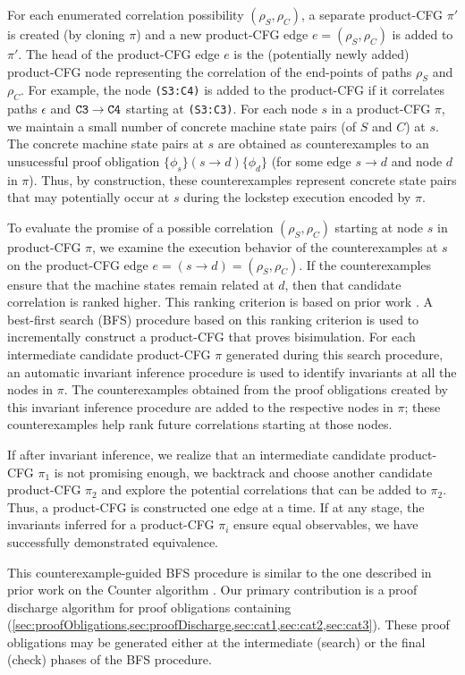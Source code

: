For each enumerated correlation possibility $(\rho_S,\rho_C)$,
a separate
product-CFG $\pi'$ is created (by cloning $\pi$)
and a new product-CFG
edge $e=(\rho_S,\rho_C)$ is added to $\pi'$.
The head of the product-CFG edge $e$ is the
(potentially newly added) product-CFG node representing
the correlation of the end-points of paths $\rho_S$
and $\rho_C$. For example, the node {\tt (S3:C4)} is added
to the product-CFG if it correlates paths $\epsilon$ and ${\tt C3\rightarrow{}C4}$
starting at {\tt (S3:C3)}.
For each node $s$ in a product-CFG $\pi$, we maintain
a small number of
concrete machine state pairs (of $S$ and $C$) at $s$.
The concrete
machine state pairs at $s$
are obtained as
counterexamples to an unsucessful proof
obligation $\{\phi_s\} (s \rightarrow d) \{\phi_d\}$ (for
some edge $s \rightarrow d$ and node $d$ in $\pi$).
Thus, by construction, these counterexamples represent
concrete state pairs that
may potentially occur
at $s$ during the lockstep execution encoded
by $\pi$.

To evaluate the promise of a possible correlation
$(\rho_S,\rho_C)$ starting at node $s$
in product-CFG $\pi$,
we examine the execution
behavior of the counterexamples at $s$ on
the product-CFG edge $e=(s\rightarrow d)=(\rho_S,\rho_C)$.
If the counterexamples ensure that the machine
states remain
related at $d$, then that candidate correlation
is ranked higher.
This ranking criterion is based on prior work \cite{oopsla20}.
A best-first search (BFS) procedure based on this ranking
criterion is used to incrementally construct
a product-CFG that proves bisimulation.
For each intermediate candidate product-CFG $\pi$ generated
during this search procedure,
an automatic invariant inference procedure is used
to identify invariants at all the nodes in $\pi$.
The counterexamples
obtained from the proof obligations created
by this invariant inference procedure are added to the
respective nodes in $\pi$; these counterexamples
help rank future correlations starting at those
nodes.

If after invariant inference,
we realize that an intermediate candidate product-CFG $\pi_1$
is not promising enough,
we backtrack and choose another
candidate product-CFG $\pi_2$ and explore the potential correlations that
can be added to $\pi_2$.
Thus, a product-CFG is constructed one edge at a time.
If at any stage, the invariants inferred for a product-CFG
$\pi_i$ ensure equal
observables, we have successfully demonstrated equivalence.

This counterexample-guided BFS procedure
is similar to the one described in prior work on
the Counter algorithm \cite{oopsla20}. Our
primary contribution is a proof discharge
algorithm for proof obligations containing
\recursiveRelations{}
(\cref{sec:proofObligations,sec:proofDischarge,sec:cat1,sec:cat2,sec:cat3}).
These proof obligations may
be generated either at the intermediate (search) or
the final (check)
phases of the BFS procedure.
